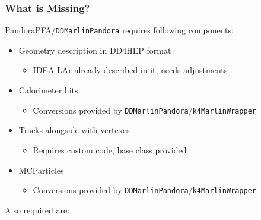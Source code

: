 \documentclass[aspectratio=169]{beamer}
\newcommand{\bluetext}[1]{%
  \textcolor{myBlue}{#1}
}
\newcommand{\redtext}[1]{%
  \textcolor{myRed}{#1}
}
\begin{document}
\begin{frame}
  \frametitle{What is Missing?}

  \scriptsize
  PandoraPFA/\texttt{DDMarlinPandora} requires following components:

  \vspace{-1ex}

  \begin{itemize}\scriptsize
    \item \bluetext{Geometry description in DD4HEP format}
          \begin{itemize}\scriptsize
            \item IDEA-LAr already described in it, needs adjustments
          \end{itemize}
   \item \bluetext{Calorimeter hits}
          \begin{itemize}\scriptsize
            \item Conversions provided by
                  \texttt{DDMarlinPandora}/\texttt{k4MarlinWrapper}
          \end{itemize}
    \item \redtext{Tracks alongside with vertexes}
          \begin{itemize}\scriptsize
            \item Requires custom code, base class provided
          \end{itemize}
    \item \bluetext{MCParticles}
          \begin{itemize}\scriptsize
            \item Conversions provided by
                  \texttt{DDMarlinPandora}/\texttt{k4MarlinWrapper}
          \end{itemize}
  \end{itemize}

  Also required are:

  \vspace{-1ex}


\end{frame}
\end{document}
